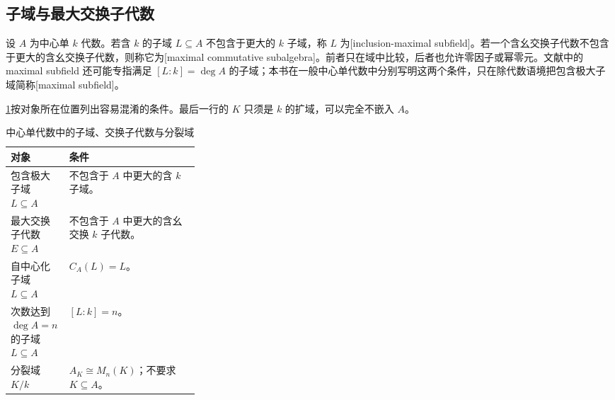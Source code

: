 \subsection{子域与最大交换子代数}
\label{b2:subsec:1702:03}

设 \(A\) 为中心单 \(k\) 代数。若含 \(k\) 的子域 \(L\subseteq A\) 不包含于更大的 \(k\) 子域，称 \(L\) 为[inclusion-maximal subfield]。若一个含幺交换子代数不包含于更大的含幺交换子代数，则称它为[maximal commutative subalgebra]。前者只在域中比较，后者也允许零因子或幂零元。文献中的 maximal subfield 还可能专指满足 \([L:k]=\deg A\) 的子域；本书在一般中心单代数中分别写明这两个条件，只在除代数语境把包含极大子域简称[maximal subfield]。

\cref{b2:tab:csa-subfield-conditions}按对象所在位置列出容易混淆的条件。最后一行的 \(K\) 只须是 \(k\) 的扩域，可以完全不嵌入 \(A\)。
\begin{table}[htbp]
	\centering
	\caption{中心单代数中的子域、交换子代数与分裂域}\label{b2:tab:csa-subfield-conditions}
	\begin{tabularx}{\linewidth}{@{}p{0.31\linewidth}X@{}}
		\toprule
		对象 & 条件 \\
		\midrule
		包含极大子域 \(L\subseteq A\) & 不包含于 \(A\) 中更大的含 \(k\) 子域。\\
		最大交换子代数 \(E\subseteq A\) & 不包含于 \(A\) 中更大的含幺交换 \(k\) 子代数。\\
		自中心化子域 \(L\subseteq A\) & \(C_A(L)=L\)。\\
		次数达到 \(\deg A=n\) 的子域 \(L\subseteq A\) & \([L:k]=n\)。\\
		分裂域 \(K/k\) & \(A_K\cong M_n(K)\)；不要求 \(K\subseteq A\)。\\
		\bottomrule
	\end{tabularx}
\end{table}

